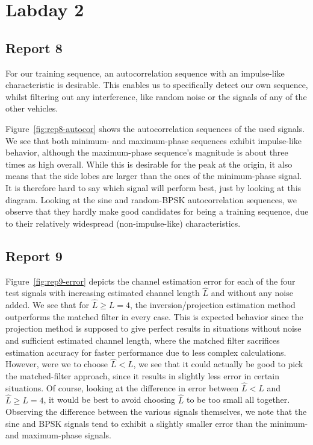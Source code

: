 \documentclass[11pt,titlepage]{report}
\begin{document}
\section{Labday 2}
\subsection{Report 8}
For our training sequence, an autocorrelation sequence with an impulse-like characteristic is desirable. This enables us to specifically detect our own sequence, whilst filtering out any interference, like random noise or the signals of any of the other vehicles. 


Figure~\ref{fig:rep8-autocor} shows the autocorrelation sequences of the used signals. We see that both minimum- and maximum-phase sequences exhibit impulse-like behavior, although the maximum-phase sequence's magnitude is about three times as high overall. While this is desirable for the peak at the origin, it also means that the side lobes are larger than the ones of the minimum-phase signal. It is therefore hard to say which signal will perform best, just by looking at this diagram. Looking at the sine and random-BPSK autocorrelation sequences, we observe that they hardly make good candidates for being a training sequence, due to their relatively widespread (non-impulse-like) characteristics.

\subsection{Report 9}

Figure~\ref{fig:rep9-error} depicts the channel estimation error for each of the four test signals with increasing estimated channel length $\hat{L}$ and without any noise added. We see that for $\hat{L} \ge L = 4$, the inversion/projection estimation method outperforms the matched filter in every case. This is expected behavior since the projection method is supposed to give perfect results in situations without noise and sufficient estimated channel length, where the matched filter sacrifices estimation accuracy for faster performance due to less complex calculations.
However, were we to choose $\hat{L} < L$, we see that it could actually be good to pick the matched-filter approach, since it results in slightly less error in certain situations. Of course, looking at the difference in error between $\hat{L} < L$ and $\hat{L} \ge L = 4$, it would be best to avoid choosing $\hat{L}$ to be too small all together.
Observing the difference between the various signals themselves, we note that the sine and BPSK signals tend to exhibit a slightly smaller error than the minimum- and maximum-phase signals.
\end{document}
